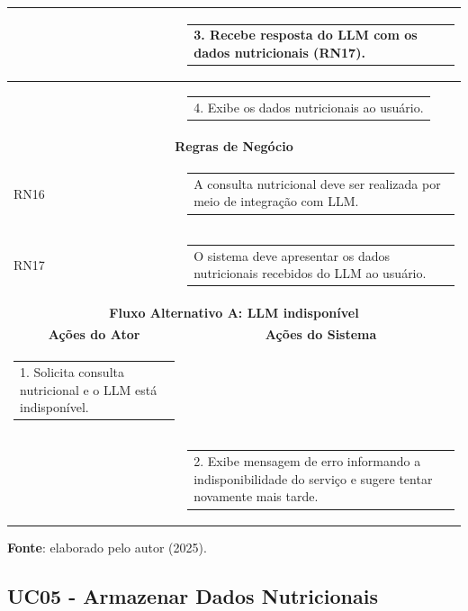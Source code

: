 \begin{longtable}[c]{|p{}|p{}|}
\multicolumn{1}{|p{0.48\textwidth}|}{} &
  \begin{tabular}[c]{@{}p{}@{}}3. Recebe resposta do LLM com os dados nutricionais (RN17).\end{tabular} \\ \hline
\multicolumn{1}{|p{0.48\textwidth}|}{} &
  \begin{tabular}[c]{@{}p{}@{}}4. Exibe os dados nutricionais ao usuário.\end{tabular} \\ \hline
\multicolumn{2}{|c|}{\textbf{Regras de Negócio}} \\ \hline
\multicolumn{1}{|p{0.48\textwidth}|}{RN16} &
  \begin{tabular}[c]{@{}p{}@{}}A consulta nutricional deve ser realizada por meio de integração com LLM.\end{tabular} \\ \hline
\multicolumn{1}{|p{0.48\textwidth}|}{RN17} &
  \begin{tabular}[c]{@{}p{}@{}}O sistema deve apresentar os dados nutricionais recebidos do LLM ao usuário.\end{tabular} \\ \hline
\multicolumn{2}{|c|}{\textbf{Fluxo Alternativo A: LLM indisponível}} \\ \hline
\multicolumn{1}{|c|}{\textbf{Ações do Ator}} &
  \multicolumn{1}{c|}{\textbf{Ações do Sistema}} \\ \hline
\multicolumn{1}{|p{0.48\textwidth}|}{\begin{tabular}[c]{@{}p{}@{}}1. Solicita consulta nutricional e o LLM está indisponível.\end{tabular}} & \\ \hline
\multicolumn{1}{|p{0.48\textwidth}|}{} &
  \begin{tabular}[c]{@{}p{}@{}}2. Exibe mensagem de erro informando a indisponibilidade do serviço e sugere tentar novamente mais tarde.\end{tabular} \\ \hline
\end{longtable}
\begin{center}
    \small{\textbf{Fonte}: elaborado pelo autor (2025).}
\end{center}


\subsection{UC05 - Armazenar Dados Nutricionais}

